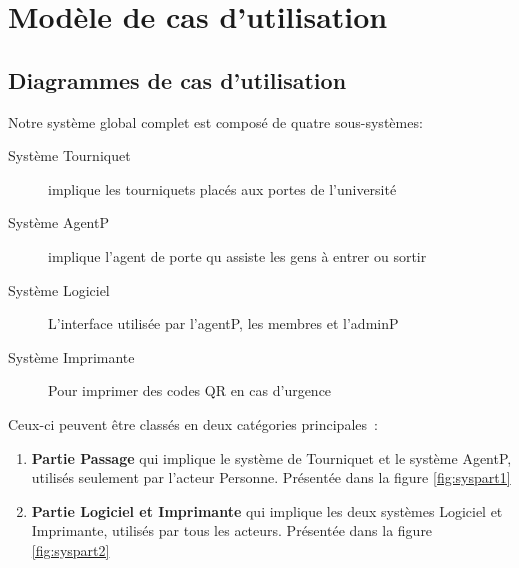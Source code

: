 

\section{Modèle de cas d'utilisation}
    \subsection{Diagrammes de cas d'utilisation}
    Notre système global complet est composé de quatre sous-systèmes:
    \begin{description}
        
        \item[Système Tourniquet] implique les tourniquets placés aux portes de l'université
        \item[Système AgentP] implique l'agent de porte qu assiste les gens à entrer ou sortir 
        \item[Système Logiciel] L'interface utilisée par l'agentP, les membres et l'adminP
        \item[Système Imprimante] Pour imprimer des codes QR en cas d'urgence


    \end{description}
    \vspace{8px}
    
    Ceux-ci peuvent être classés en deux catégories principales :\linebreak 
    \begin{enumerate}
        \item \textbf{Partie Passage} qui implique le système de Tourniquet et le système AgentP, utilisés seulement par l'acteur Personne. Présentée dans la figure \ref{fig:syspart1}
        \linebreak
        \item \textbf{Partie Logiciel et Imprimante} qui implique les deux systèmes Logiciel et Imprimante, utilisés par tous les acteurs. Présentée dans la figure \ref{fig:syspart2}
    \end{enumerate}
    \vspace{8px}

    
    

